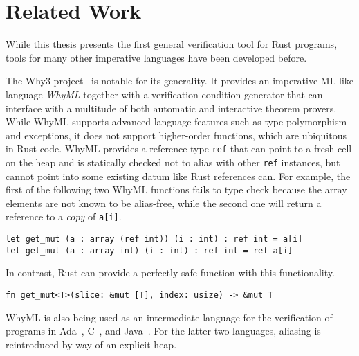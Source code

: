 \section{Related Work}
\label{sec:related}

While this thesis presents the first general verification tool for Rust programs, tools
for many other imperative languages have been developed before.

The Why3 project~\cite{bobot2011why3} is notable for its generality. It provides
an imperative ML-like language \emph{WhyML} together with a verification
condition generator that can interface with a multitude of both automatic and
interactive theorem provers. While WhyML supports advanced language features such
as type polymorphism and exceptions, it does not support higher-order functions,
which are ubiquitous in Rust code.
WhyML provides a reference type \texttt{ref} that can point to a fresh cell on
the heap and is statically checked not to alias with other \texttt{ref}
instances, but cannot point into some existing datum like Rust references can.
For example, the first of the following two WhyML functions fails to type check
because the array elements are not known to be alias-free, while the second one
will return a reference to a \emph{copy} of \verb!a[i]!.

\begin{verbatim}
let get_mut (a : array (ref int)) (i : int) : ref int = a[i]
let get_mut (a : array int) (i : int) : ref int = ref a[i]
\end{verbatim}

In contrast, Rust can provide a perfectly safe function with this functionality.

\begin{verbatim}
fn get_mut<T>(slice: &mut [T], index: usize) -> &mut T
\end{verbatim}

WhyML is also being used as an intermediate language for the verification of
programs in Ada~\cite{guitton2011hi}, C~\cite{cuoq2012frama}, and Java~\cite{filliatre2007krakatoa}.
For the latter two languages, aliasing is reintroduced by way of an explicit heap.

